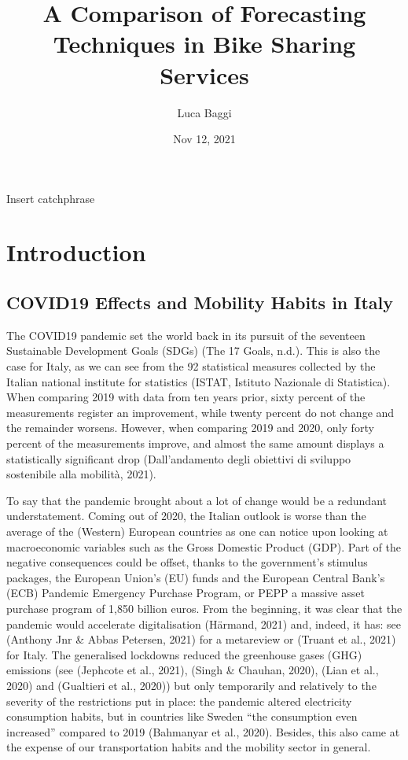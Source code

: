 \documentclass[letterpaper,10pt,english]{jupyterBook}
\title{A Comparison of Forecasting Techniques in Bike Sharing Services}
\date{Nov 12, 2021}
\author{Luca Baggi}
\begin{document}
\pagestyle{empty}
\sphinxmaketitle
\pagestyle{plain}
\sphinxtableofcontents
\pagestyle{normal}
\label{\detokenize{frontmatter::doc}}


\sphinxAtStartPar
Insert catchphrase


\chapter{Introduction}
\label{\detokenize{01-introduction:introduction}}\label{\detokenize{01-introduction::doc}}

\section{COVID\sphinxhyphen{}19 Effects and Mobility Habits in Italy}
\label{\detokenize{01-introduction:covid-19-effects-and-mobility-habits-in-italy}}
\sphinxAtStartPar
The COVID\sphinxhyphen{}19 pandemic set the world back in its pursuit of the seventeen Sustainable Development Goals (SDGs) (The 17 Goals, n.d.). This is also the case for Italy, as we can see from the 92 statistical measures collected by the Italian national institute for statistics (ISTAT, Istituto Nazionale di Statistica). When comparing 2019 with data from ten years prior, sixty percent of the measurements register an improvement, while twenty percent do not change and the remainder worsens. However, when comparing 2019 and 2020, only forty percent of the measurements improve, and almost the same amount displays a statistically significant drop (Dall’andamento degli obiettivi di sviluppo sostenibile alla mobilità, 2021).

\sphinxAtStartPar
To say that the pandemic brought about a lot of change would be a redundant understatement. Coming out of 2020, the Italian outlook is worse than the average of the (Western) European countries \sphinxhyphen{} as one can notice upon looking at macroeconomic variables such as the Gross Domestic Product (GDP). Part of the negative consequences could be offset, thanks to the government’s stimulus packages, the European Union’s (EU) funds and the European Central Bank’s (ECB) Pandemic Emergency Purchase Program, or PEPP \sphinxhyphen{} a massive asset purchase program of 1,850 billion euros. From the beginning, it was clear that the pandemic would accelerate digitalisation (Härmand, 2021) \sphinxhyphen{} and, indeed, it has: see (Anthony Jnr \& Abbas Petersen, 2021) for a meta\sphinxhyphen{}review or (Truant et al., 2021) for Italy. The generalised lockdowns reduced the greenhouse gases (GHG) emissions (see (Jephcote et al., 2021), (Singh \& Chauhan, 2020), (Lian et al., 2020) and (Gualtieri et al., 2020)) but only temporarily and relatively to the severity of the restrictions put in place: the pandemic altered electricity consumption habits, but in countries like Sweden “the consumption even increased” compared to 2019 (Bahmanyar et al., 2020). Besides, this also came at the expense of our transportation habits and the mobility sector in general.
\end{document}

